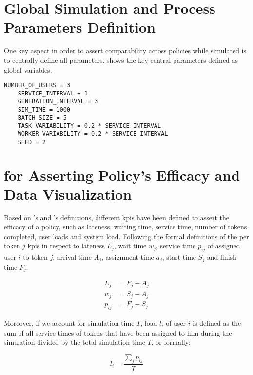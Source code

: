 
\section{Global Simulation and Process Parameters Definition}

One key aspect in order to assert comparability across policies while simulated is to centrally define all parameters.  shows the key central parameters defined as global variables.

\begin{lstlisting}[caption=Global parameters definition that ensures comparability across simulation runs,label=lst:central_parameters,style=CustomPython]
	NUMBER_OF_USERS = 3
	SERVICE_INTERVAL = 1
	GENERATION_INTERVAL = 3
	SIM_TIME = 1000
	BATCH_SIZE = 5
	TASK_VARIABILITY = 0.2 * SERVICE_INTERVAL
	WORKER_VARIABILITY = 0.2 * SERVICE_INTERVAL
	SEED = 2
\end{lstlisting}

\section{ for Asserting Policy's Efficacy and Data Visualization}

Based on \citet{Pinedo2008}'s and \citet{Zeng2005}'s definitions, different \glspl{kpi} have been defined to assert the efficacy of a policy, such as lateness, waiting time, service time, number of tokens completed, user loads and system load. Following the formal definitions of the per token $j$ \glspl{kpi} in respect to lateness $L_j$, wait time $w_j$, service time $p_{ij}$ of assigned user $i$ to token $j$, arrival time $A_j$, assignment time $a_j$, start time $S_j$ and finish time $F_j$.

\begin{align}
	L_j&=F_j-A_j \label{eq:lateness}\\
	w_j&=S_j-A_j \\
	p_{ij}&=F_j-S_j
\end{align}

Moreover, if we account for simulation time $T$, load $l_i$ of user $i$ is defined as the sum of all service times of tokens that have been assigned to him during the simulation divided by the total simulation time $T$, or formally:

\begin{equation}
	l_i=\frac{\sum_j p_{ij}}{T}
\end{equation}

